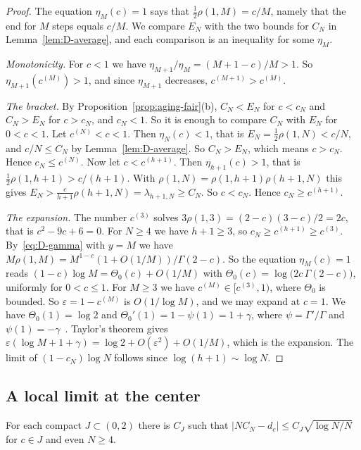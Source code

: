 \begin{proof}
The equation $\eta_M(c)=1$ says that $\frac12\rho(1,M)=c/M$, namely that the
end for $M$ steps equals $c/M$. We compare $E_N$ with the two bounds for $C_N$
in Lemma~\ref{lem:D-average}, and each comparison is an inequality for some
$\eta_M$.

\emph{Monotonicity.} For $c<1$ we have $\eta_{M+1}/\eta_M=(M+1-c)/M>1$. So
$\eta_{M+1}(c^{(M)})>1$, and since $\eta_{M+1}$ decreases, $c^{(M+1)}>c^{(M)}$.

\emph{The bracket.} By Proposition~\ref{prop:aging-fair}(b), $C_N<E_N$ for
$c<c_N$ and $C_N>E_N$ for $c>c_N$, and $c_N<1$. So it is enough to compare
$C_N$ with $E_N$ for $0<c<1$. Let $c^{(N)}<c<1$. Then $\eta_N(c)<1$, that is
$E_N=\frac12\rho(1,N)<c/N$, and $c/N\le C_N$ by Lemma~\ref{lem:D-average}. So
$C_N>E_N$, which means $c>c_N$. Hence $c_N\le c^{(N)}$. Now let
$c<c^{(h+1)}$. Then $\eta_{h+1}(c)>1$, that is
$\frac12\rho(1,h+1)>c/(h+1)$. With $\rho(1,N)=\rho(1,h+1)\rho(h+1,N)$ this
gives $E_N>\frac{c}{h+1}\rho(h+1,N)=\lambda_{h+1,N}\ge C_N$. So $c<c_N$.
Hence $c_N\ge c^{(h+1)}$.

\emph{The expansion.} The number $c^{(3)}$ solves
$3\rho(1,3)=(2-c)(3-c)/2=2c$, that is $c^2-9c+6=0$. For $N\ge4$ we have
$h+1\ge3$, so $c_N\ge c^{(h+1)}\ge c^{(3)}$. By~\eqref{eq:D-gamma} with $y=M$
we have $M\rho(1,M)=M^{1-c}(1+O(1/M))/\Gamma(2-c)$. So the equation
$\eta_M(c)=1$ reads $(1-c)\log M=\Theta_0(c)+O(1/M)$ with
$\Theta_0(c)=\log\bigl(2c\,\Gamma(2-c)\bigr)$, uniformly for $0<c\le1$. For
$M\ge3$ we have $c^{(M)}\in[c^{(3)},1)$, where $\Theta_0$ is bounded. So
$\varepsilon=1-c^{(M)}$ is $O(1/\log M)$, and we may expand at $c=1$. We have
$\Theta_0(1)=\log2$ and $\Theta_0'(1)=1-\psi(1)=1+\gamma$, where
$\psi=\Gamma'/\Gamma$ and $\psi(1)=-\gamma$~\cite[5.4.12]{dlmf}. Taylor's
theorem gives
$\varepsilon(\log M+1+\gamma)=\log2+O(\varepsilon^2)+O(1/M)$, which is the
expansion. The limit
of $(1-c_N)\log N$ follows since $\log(h+1)\sim\log N$.
\end{proof}

\subsection{A local limit at the center}

\begin{proposition}\label{prop:D-llt}
For each compact $J\subset(0,2)$ there is $C_J$ such that
$\bigl\lvert NC_N-d_c\bigr\rvert\le C_J\sqrt{\log N/N}$ for $c\in J$
and even $N\ge4$.
\end{proposition}

